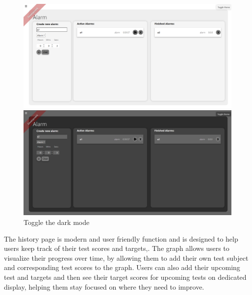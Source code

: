 \documentclass[a4paper]{article}
\begin{document}
\begin{figure}[H]
  \centering
  \begin{minipage}{0.49\textwidth}
    \centering
    \includegraphics[width=\linewidth]{./image/AlarmTimer_light.png}
  \end{minipage}\hfill
  \begin{minipage}{0.49\textwidth}
    \centering
    \includegraphics[width=\linewidth]{./image/AlarmTimer_dark.png}
  \end{minipage}
  \caption*{Toggle the dark mode}
\end{figure}

The history page is modern and user friendly function and is designed to help users keep track of their test scores and targets,. The graph allows users to visualize their progress over time,  by allowing them to add their own test subject and corresponding test scores to the graph. Users can also add their upcoming test and targets and then see their target scores for upcoming tests on dedicated display, helping them stay focused on where they need to improve.
\end{document}
